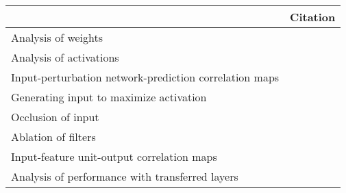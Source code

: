\begin{tabular}{ll}
\toprule
{} &                                                                                                                                                                                          Citation \\
\midrule
Analysis of weights                                    &  \cite{Perez-Benitez2018, Yoon2018, Langkvist2018, Deiss2018, Lawhern2018, Xu2016, Tsinalis2016a, Nurse2016, Tabar2016a, Zheng2015, Stober2015, Manor2015, Yang2015a, Langkvist2012, Cecotti2011} \\
Analysis of activations                                &                                                                                           \cite{Yuan2018a, Waytowich2018, Lawhern2018, kwak2017, Yin2017a, Supratak2017, Shamwell2016, Manor2015} \\
Input-perturbation network-prediction correlation maps &                                                                                                              \cite{Schirrmeister2017a, Volker2018, Hartmann2018b, Behncke2017, Schirrmeister2017} \\
Generating input to maximize activation                &                                                                                                                                      \cite{VanPutten2018b, Ruffini2018a, Sors2018, Bashivan2016a} \\
Occlusion of input                                     &                                                                                                                                                        \cite{Lee2018, Chambon2018, Thodoroff2016} \\
Ablation of filters                                    &                                                                                                                                                                                \cite{Lawhern2018} \\
Input-feature unit-output correlation maps             &                                                                                                                                                                          \cite{Schirrmeister2017} \\
Analysis of performance with transferred layers        &                                                                                                                                                                            \cite{Hajinoroozi2017} \\

\end{tabular}
